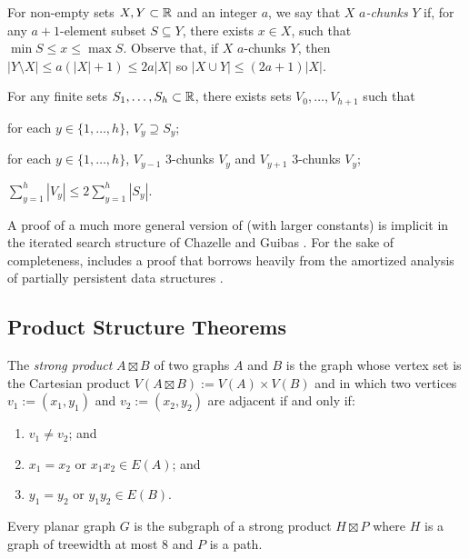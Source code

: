 \documentclass[kpfonts]{patmorin}
\let\le\leqslant
\begin{document}
For non-empty sets $X,Y\subset \mathbb{R}$ and an integer $a$, we say that $X$ \emph{$a$-chunks} $Y$ if, for any $a+1$-element subset $S\subseteq Y$, there exists $x\in X$, such that $\min S\le x\le \max S$. Observe that, if $X$ $a$-chunks $Y$, then $|Y\setminus X|\le a(|X|+1)\le 2a|X|$ so $|X\cup Y|\le (2a+1)|X|$. 

\begin{lem}
  For any finite sets $S_1,\ldots,S_h\subset\mathbb{R}$, there exists sets $V_0,\ldots,V_{h+1}$ such that
  \begin{compactenum}
    \item for each $y\in\{1,\ldots,h\}$, $V_y\supseteq S_y$;
    \item for each $y\in\{1,\ldots,h\}$, $V_{y-1}$ 3-chunks $V_y$ and $V_{y+1}$ 3-chunks $V_y$;
    \item $\sum_{y=1}^h |V_y|\le 2\sum_{y=1}^h |S_y|$.
  \end{compactenum}
\end{lem}

A proof of a much more general version of  (with larger constants) is implicit in the iterated search structure of Chazelle and Guibas \cite{chazelle.guibas:fractional1}.   For the sake of completeness,  includes a proof that borrows heavily from the amortized analysis of partially persistent data structures \cite[Section~2.3]{driscoll.sarnak.ea:making}.


\subsection{Product Structure Theorems}

The \emph{strong product} $A\boxtimes B$ of two graphs $A$ and $B$ is the graph whose vertex set is the Cartesian product $V(A\boxtimes B):=V(A)\times V(B)$ and in which two vertices $v_1:=(x_1,y_1)$ and $v_2:=(x_2,y_2)$ are adjacent if and only if:
\begin{enumerate}
  \item  $v_1\neq v_2$; and
  \item $x_1=x_2$ or $x_1x_2\in E(A)$; and
  \item $y_1=y_2$ or $y_1y_2\in E(B)$.
\end{enumerate}

\begin{thm}
  Every planar graph $G$ is the subgraph of a strong product $H\boxtimes P$ where $H$ is a graph of treewidth at most 8 and $P$ is a path.
\end{thm}
\end{document}
